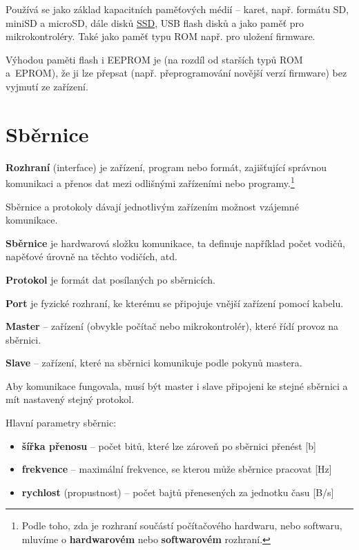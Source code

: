 \documentclass[12pt]{article}
\begin{document}
Používá se jako základ kapacitních paměťových médií -- karet, např. formátu SD, miniSD a microSD, dále disků \href{https://cs.wikipedia.org/wiki/Solid-state_drive}{SSD},
 USB flash disků a jako paměť pro mikrokontroléry. Také jako paměť typu ROM např. pro uložení firmware.  

 Výhodou paměti flash i EEPROM je (na rozdíl od starších typů ROM a~EP\-ROM), že ji lze přepsat (např. pře\-pro\-gra\-mo\-vá\-ní novější verzí firmware) bez vyjmutí ze zařízení.    
 
\section{Sběrnice}

\textbf{Rozhraní} (interface) je zařízení, program nebo formát, zajišťující správnou komunikaci a přenos dat mezi odlišnými zařízeními nebo programy.\footnote{Podle toho, zda je rozhraní součástí počítačového hardwaru, nebo softwaru, mluvíme o \textbf{hardwarovém} nebo \textbf{softwarovém} rozhraní.}

Sběrnice a protokoly dávají jednotlivým zařízením možnost vzájemné komunikace.

\textbf{Sběrnice} je hardwarová složku komunikace, ta definuje například počet vodičů, napěťové úrovně na těchto vodičích, atd.


\textbf{Protokol} je formát dat posílaných po sběrnicích.

\textbf{Port} je fyzické rozhraní, ke kterému se připojuje vnější zařízení pomocí kabelu.

\textbf{Master} -- zařízení (obvykle počítač nebo mikrokontrolér), které řídí provoz na sběrnici.

\textbf{Slave} -- zařízení, které na sběrnici komunikuje podle pokynů mastera. 

Aby komunikace fungovala, musí být master i slave připojeni ke stejné sběrnici a mít nastavený stejný protokol. 

Hlavní parametry sběrnic:
\begin{itemize}
	\item \textbf{šířka přenosu} -- počet bitů, které lze zároveň po sběrnici přenést  [b]
	\item \textbf{frekvence} -- maximální frekvence, se kterou může sběrnice pracovat [Hz]
	\item \textbf{rychlost} (propustnost) -- počet bajtů přenesených za jednotku času [B/s]
\end{itemize}
\end{document}
